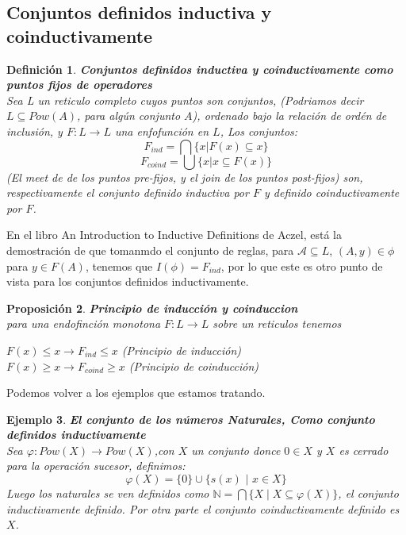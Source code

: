 \documentclass[executivepaper]{article}
\newtheorem{propo}{Proposición}[section]
\newtheorem{defi}[propo]{Definición}
\newtheorem{ejemplo}[propo]{Ejemplo}
\newcommand{\A}{\mathcal{A}}
\newcommand{\N}{\mathbb{N}}
\begin{document}
\subsection*{Conjuntos definidos inductiva y coinductivamente}

\begin{defi}\textbf{Conjuntos definidos inductiva y coinductivamente como puntos fijos de operadores} \\
    Sea L un reticulo completo cuyos puntos son conjuntos, (Podriamos decir $L\subseteq Pow(A)$, para algún conjunto $A$), ordenado bajo la relación de ordén de inclusión, y $F:L\rightarrow L$ una enfofunción en $L$, Los conjuntos:
    $$F_{ind} = \bigcap \{x|F(x)\subseteq x\}$$
    $$F_{coind} = \bigcup \{x|x\subseteq F(x)\}$$
    (El meet de de los puntos pre-fijos, y el join de los puntos post-fijos) son, respectivamente el conjunto definido inductiva por $F$ y definido coinductivamente por $F$.
\end{defi}

En el libro An Introduction to Inductive Definitions de Aczel, está la demostración de que tomanmdo el conjunto de reglas, para $\A\subseteq L$, $(A,y)\in\phi$ para $y\in F(A)$, tenemos que $I(\phi) = F_{ind}$, por lo que este es otro punto de vista para los conjuntos definidos inductivamente.  

\begin{propo}\textbf{Principio de inducción y coinduccion}\\
    para una endofinción monotona $F:L\rightarrow L$ sobre un reticulos tenemos
    \begin{center}
        $F(x)\leq x \rightarrow F_{ind}\leq x$ (Principio de inducción)\\
        $F(x)\geq x \rightarrow F_{coind}\geq x$ (Principio de coinducción)
    \end{center}
\end{propo}

Podemos volver a los ejemplos que estamos tratando. 

\begin{ejemplo} \textbf{El conjunto de los números Naturales, Como conjunto definidos inductivamente}\\
Sea $\varphi:Pow(X)\longrightarrow Pow(X)$,con $X$ un conjunto donce $0\in X$ y $X$ es cerrado para la operación sucesor, definimos:
$$\varphi(X)=\{0\} \cup \{s(x)\,\,|\,\,x\in X\}$$
Luego los naturales se ven definidos como $\N=\bigcap \{X \mid X\subseteq\varphi(X)\}$, el conjunto inductivamente definido. Por otra parte el conjunto coinductivamente definido es $X$.
\end{ejemplo}
    
\end{document}
